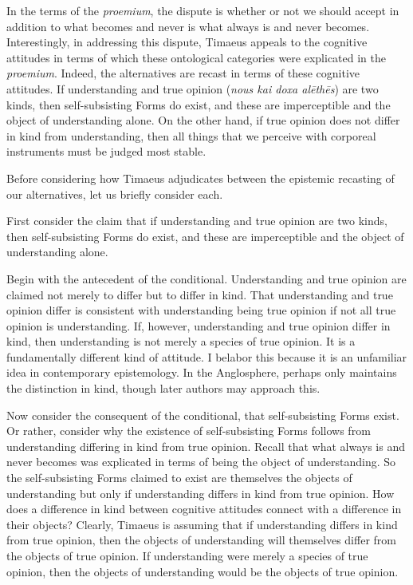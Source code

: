 In the terms of the \emph{proemium}, the dispute is whether or not we should accept in addition to what becomes and never is what always is and never becomes. Interestingly, in addressing this dispute, Timaeus appeals to the cognitive attitudes in terms of which these ontological categories were explicated in the \emph{proemium}. Indeed, the alternatives are recast in terms of these cognitive attitudes. If understanding and true opinion (\emph{nous kai doxa alēthēs}) are two kinds, then self-subsisting Forms do exist, and these are imperceptible and the object of understanding alone. On the other hand, if true opinion does not differ in kind from understanding, then all things that we perceive with corporeal instruments must be judged most stable.

Before considering how Timaeus adjudicates between the epistemic recasting of our alternatives, let us briefly consider each.

First consider the claim that if understanding and true opinion are two kinds, then self-subsisting Forms do exist, and these are imperceptible and the object of understanding alone. 

Begin with the antecedent of the conditional. Understanding and true opinion are claimed not merely to differ but to differ in kind. That understanding and true opinion differ is consistent with understanding being true opinion if not all true opinion is understanding. If, however, understanding and true opinion differ in kind, then understanding is not merely a species of true opinion. It is a fundamentally different kind of attitude. I belabor this because it is an unfamiliar idea in contemporary epistemology. In the Anglosphere, perhaps only \citet{Cook-Wilson:1926sf} maintains the distinction in kind, though later authors may approach this.

Now consider the consequent of the conditional, that self-subsisting Forms exist. Or rather, consider why the existence of self-subsisting Forms follows from understanding differing in kind from true opinion. Recall that what always is and never becomes was explicated in terms of being the object of understanding. So the self-subsisting Forms claimed to exist are themselves the objects of understanding but only if understanding differs in kind from true opinion. How does a difference in kind between cognitive attitudes connect with a difference in their objects? Clearly, Timaeus is assuming that if understanding differs in kind from true opinion, then the objects of understanding will themselves differ from the objects of true opinion. If understanding were merely a species of true opinion, then the objects of understanding would be the objects of true opinion. 

